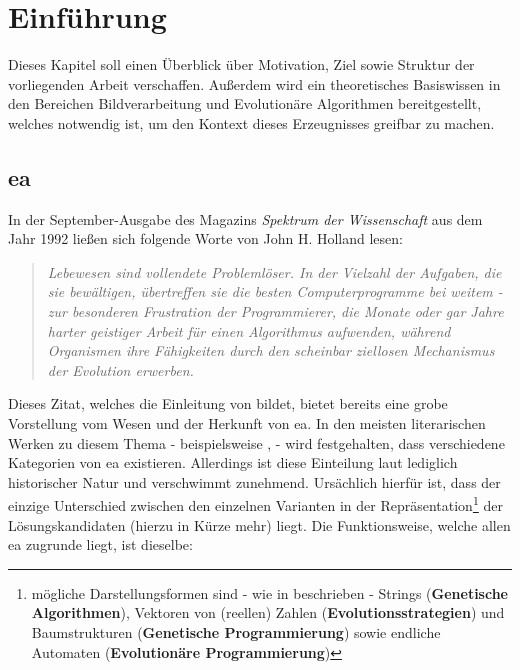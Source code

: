 
\chapter{Einführung}
\label{sec:intro}
	Dieses Kapitel soll einen Überblick über Motivation, Ziel sowie Struktur der vorliegenden Arbeit verschaffen. Außerdem wird ein theoretisches Basiswissen in den Bereichen Bildverarbeitung und Evolutionäre Algorithmen bereitgestellt, welches notwendig ist, um den Kontext dieses Erzeugnisses greifbar zu machen. 
	
	\section{\gls{ea}}
	\label{sec:evol}
		
		In der September-Ausgabe des Magazins \textit{Spektrum der Wissenschaft} \cite{j-h-holland} aus dem Jahr 1992 ließen sich folgende Worte von John H. Holland lesen: \\
		
		\begin{quote}
			\textit{Lebewesen sind vollendete Problemlöser. In der Vielzahl der Aufgaben, die sie bewältigen, übertreffen sie die besten Computerprogramme bei weitem - zur besonderen Frustration der Programmierer, die Monate oder gar Jahre harter geistiger Arbeit für einen Algorithmus aufwenden, während Organismen ihre Fähigkeiten durch den scheinbar ziellosen Mechanismus der Evolution erwerben. \\}
		\end{quote}
		
		Dieses Zitat, welches die Einleitung von \cite{ger-kla-kru-intro} bildet, bietet bereits eine grobe Vorstellung vom Wesen und der Herkunft von \gls{ea}. In den meisten literarischen Werken zu diesem Thema - beispielsweise \cite{ger-kla-kru-intro}, \cite{eib-smi-ea} - wird festgehalten, dass verschiedene Kategorien von \gls{ea} existieren. Allerdings ist diese Einteilung laut \cite{eib-smi-ea} lediglich historischer Natur und verschwimmt zunehmend. Ursächlich hierfür ist, dass der einzige Unterschied zwischen den einzelnen Varianten in der Repräsentation\footnote{mögliche Darstellungsformen sind - wie in \cite{eib-smi-ea} beschrieben - Strings (\textbf{Genetische Algorithmen}), Vektoren von (reellen) Zahlen (\textbf{Evolutionsstrategien}) und Baumstrukturen (\textbf{Genetische Programmierung}) sowie endliche Automaten (\textbf{Evolutionäre Programmierung})} der Lösungskandidaten (hierzu in Kürze mehr) liegt. Die Funktionsweise, welche allen \gls{ea} zugrunde liegt, ist dieselbe: \\
		
